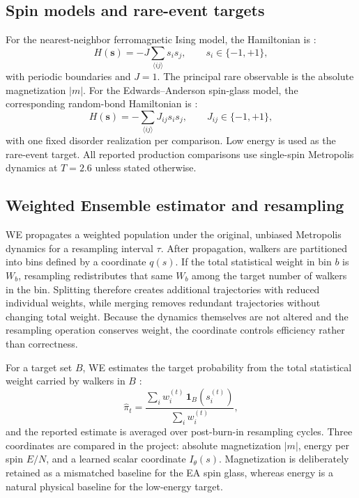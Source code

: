 \documentclass[a4paper,fleqn]{cas-sc}
\begin{document}
\subsection{Spin models and rare-event targets}
For the nearest-neighbor ferromagnetic Ising model, the Hamiltonian is \citep{ising1925,onsager1944}:
\begin{equation}
 H(\mathbf{s})=-J\sum_{\langle ij\rangle}s_i s_j, \qquad s_i\in\{-1,+1\},
\end{equation}
with periodic boundaries and $J=1$. The principal rare observable is the absolute magnetization $|m|$. For the Edwards--Anderson spin-glass model, the corresponding random-bond Hamiltonian is \citep{edwards1975,binder1986}:
\begin{equation}
 H(\mathbf{s})=-\sum_{\langle ij\rangle}J_{ij}s_i s_j, \qquad J_{ij}\in\{-1,+1\},
\end{equation}
with one fixed disorder realization per comparison. Low energy is used as the rare-event target. All reported production comparisons use single-spin Metropolis dynamics \citep{metropolis1953} at $T=2.6$ unless stated otherwise.

\subsection{Weighted Ensemble estimator and resampling}
WE propagates a weighted population under the original, unbiased Metropolis dynamics for a resampling interval $\tau$. After propagation, walkers are partitioned into bins defined by a coordinate $q(s)$. If the total statistical weight in bin $b$ is $W_b$, resampling redistributes that same $W_b$ among the target number of walkers in the bin. Splitting therefore creates additional trajectories with reduced individual weights, while merging removes redundant trajectories without changing total weight. Because the dynamics themselves are not altered and the resampling operation conserves weight, the coordinate controls efficiency rather than correctness.

For a target set $B$, WE estimates the target probability from the total statistical weight carried by walkers in $B$ \citep{zhang2010exact,bhatt2010,zuckerman2017}:
\begin{equation}
  \hat\pi_t = \frac{\sum_i w_i^{(t)}\,\mathbf{1}_B(s_i^{(t)})}{\sum_i w_i^{(t)}},
\end{equation}
and the reported estimate is averaged over post-burn-in resampling cycles. Three coordinates are compared in the project: absolute magnetization $|m|$, energy per spin $E/N$, and a learned scalar coordinate $I_\theta(s)$. Magnetization is deliberately retained as a mismatched baseline for the EA spin glass, whereas energy is a natural physical baseline for the low-energy target.
\end{document}

